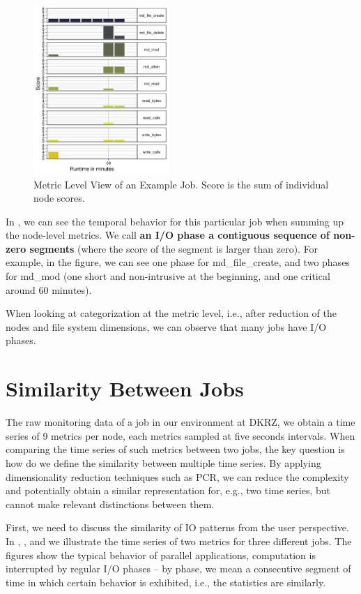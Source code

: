 \documentclass[]{llncs}
\begin{document}
\begin{figure}
	\centering
	 \includegraphics[width=2.02in,height=2.52in]{./media/image4.png}
	 \caption{Metric Level View of an Example Job. Score is the sum of individual node scores.}
	 \label{fig:seg_example}
\end{figure}

In , we can see the temporal behavior for this particular job when summing up the node-level metrics.
We call \textbf{an I/O phase a contiguous sequence of non-zero segments} (where the score of the segment is larger than zero).
For example, in the figure, we can see one phase for md\_file\_create, and two phases for md\_mod (one short and non-intrusive at the beginning, and one critical around 60 minutes).

When looking at categorization at the metric level, i.e., after reduction of the nodes and file system dimensions, we can observe that many jobs have I/O phases. 

\section{Similarity Between Jobs}
The raw monitoring data of a job in our environment at DKRZ, we obtain a time series of 9 metrics per node, each metrics sampled at five seconds intervals.
When comparing the time series of such metrics between two jobs, the key question is how do we define the similarity between multiple time series.
By applying dimensionality reduction techniques such as PCR, we can reduce the complexity and potentially obtain a similar representation for, e.g., two time series, but cannot make relevant distinctions between them.

First, we need to discuss the similarity of IO patterns from the user perspective.
In , , and  we illustrate the time series of two metrics for three different jobs.
The figures show the typical behavior of parallel applications, computation is interrupted by regular I/O phases – by phase, we mean a consecutive segment of time in which  certain behavior is exhibited, i.e., the statistics are similarly.
\end{document}
